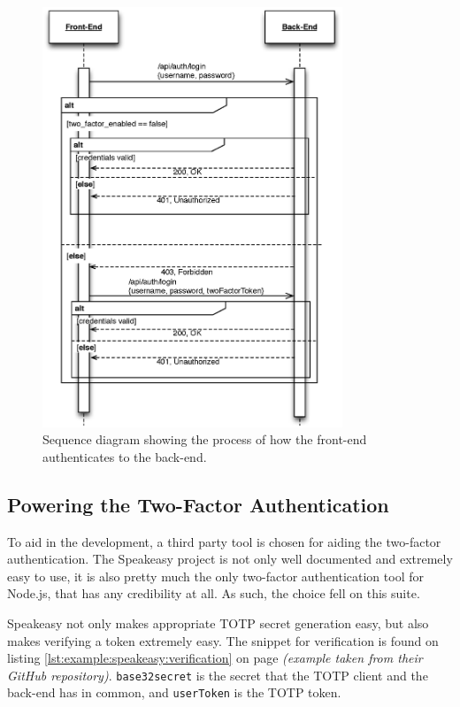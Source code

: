 		\begin{figure}[p]
			\centering
			\includegraphics[width=0.8\textwidth]{figures/implementation/uml/sequence/authentication.eps}
			\caption{Sequence diagram showing the process of how the front-end authenticates to the back-end.}
			\label{fig:sequence:auth}
		\end{figure}

		\subsection{Powering the Two-Factor Authentication}
			To aid in the development, a third party tool is chosen for aiding the two-factor authentication. The Speakeasy project\cite{speakeasy_lib} is not only well documented and extremely easy to use, it is also pretty much the only two-factor authentication tool for Node.js, that has any credibility at all. As such, the choice fell on this suite.

			Speakeasy not only makes appropriate TOTP secret generation easy, but also makes verifying a token extremely easy. The snippet for verification is found on listing \ref{lst:example:speakeasy:verification} on page \pageref{lst:example:speakeasy:verification} \emph{(example taken from their GitHub repository)}. \verb=base32secret= is the secret that the TOTP client and the back-end has in common, and \verb=userToken= is the TOTP token.


